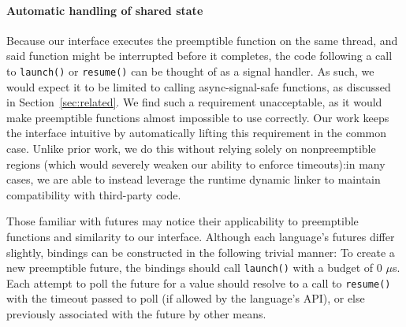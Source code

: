 \paragraph{Automatic handling of shared state}
Because our interface executes the preemptible function on the same thread, and said
function might be interrupted before it completes, the code following a call to
\texttt{launch()} or \texttt{resume()} can be thought of as a signal handler.  As
such, we would expect it to be limited to calling async-signal-safe functions, as
discussed in Section~\ref{sec:related}.  We find such a requirement unacceptable, as
it would make preemptible functions almost impossible to use correctly.  Our work
keeps the interface intuitive by automatically lifting this requirement in the common
case.  Unlike prior work, we do this without relying solely on nonpreemptible regions
(which would severely weaken our ability to enforce timeouts):\@ in many cases, we
are able to instead leverage the runtime dynamic linker to maintain compatibility
with third-party code.

\vspace{\parsep}
Those familiar with futures may notice their applicability to preemptible functions
and similarity to our interface.  Although each language's futures differ slightly,
bindings can be constructed in the following trivial manner:
To create a new preemptible future, the bindings should call \texttt{launch()} with a
budget of 0 $\mu$s.  Each attempt to poll the future for a value should resolve to a
call to \texttt{resume()} with the timeout passed to poll (if allowed by the
language's API), or else previously associated with the future by other means.
